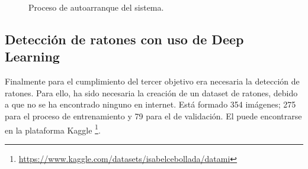 \begin{figure}[h!]
  \begin{center}
    \hspace{1mm}
    \hspace{1mm}
    \hspace{1mm}
  \end{center}
\caption{Proceso de autoarranque del sistema.} \label{fig:autoarranque}
\end{figure}

\subsection{Detección de ratones con uso de Deep Learning}
Finalmente para el cumplimiento del tercer objetivo era necesaria la detección de ratones. Para ello, ha sido necesaria la creación de un dataset de ratones, debido a que no se ha encontrado ninguno en internet. Está formado 354 imágenes; 275 para el proceso de entrenamiento y 79 para el de validación. El puede encontrarse en la plataforma Kaggle \footnote{\url{https://www.kaggle.com/datasets/isabelcebollada/datami}}.\\


